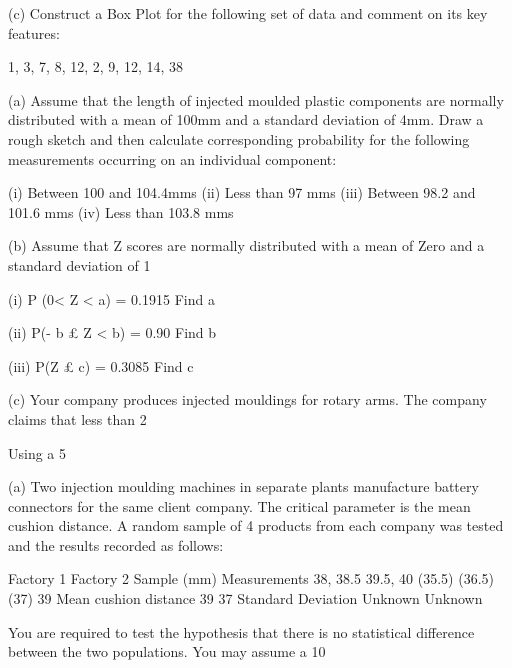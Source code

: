 (c)	Construct a Box Plot for the following set of data and comment on its key features:

1, 3, 7, 8, 12, 2, 9, 12, 14, 38



(a)	Assume that the length of injected moulded plastic components are normally distributed with a mean of 100mm and a standard deviation of 4mm.  Draw a rough sketch and then calculate corresponding probability for the following measurements occurring on an individual component:
 
(i)	Between 100 and 104.4mms
(ii)	Less than 97 mms
(iii)	Between 98.2 and 101.6 mms
(iv)	Less than 103.8 mms


(b)	Assume that Z scores are normally distributed with a mean of Zero and a
 	standard deviation of 1
 
(i) 	P (0< Z < a)  =  0.1915 			 Find   a 

(ii)            P(- b £ Z < b) =  0.90		            	 Find   b

     	(iii)             P(Z £ c)  =       0.3085 			 Find   c


(c)	Your company produces injected mouldings for rotary arms. The company claims that less than 2%

Using a 5%


(a) 	Two injection moulding machines in separate plants manufacture battery
connectors for the same client company.  The critical parameter is the mean cushion distance.  A random sample of 4 products from each company was tested and the results recorded as follows:

	Factory 1	Factory 2
Sample (mm) Measurements	38,     38.5
39.5,  40	(35.5)  (36.5)
(37)     39
Mean cushion distance	39	37
Standard Deviation	Unknown	Unknown

You are required to test the hypothesis that there is no statistical difference between the two populations.  You may assume a 10%

